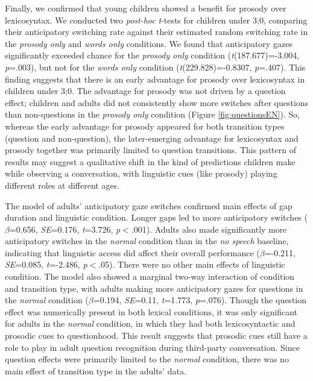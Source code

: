 \documentclass[authoryear, 12pt]{elsarticle}
\begin{document}
Finally, we confirmed that young children showed a benefit for prosody over lexicosyntax. We conducted two \textit{post-hoc} \textit{t}-tests for children under 3;0, comparing their anticipatory switching rate against their estimated random switching rate in the \textit{prosody only} and \textit{words only} conditions. We found that anticipatory gazes significantly exceeded chance for the \textit{prosody only} condition (\textit{t}(187.677)=-3.004, \textit{p}=.003), but not for the \textit{words only} condition (\textit{t}(229.828)=-0.8307, \textit{p}=.407). This finding suggests that there is an early advantage for prosody over lexicosyntax in children under 3;0. The advantage for prosody was not driven by a question effect; children and adults did not consistently show more switches after questions than non-questions in the \textit{prosody only} condition (Figure \ref{fig:questionsEN}). So, whereas the early advantage for prosody appeared for both transition types (question and non-question), the later-emerging advantage for lexicosyntax and prosody together was primarily limited to question transitions. This pattern of results may suggest a qualitative shift in the kind of predictions children make while observing a conversation, with linguistic cues (like prosody) playing different roles at different ages.

The model of adults' anticipatory gaze switches confirmed main effects of gap duration and linguistic condition. Longer gaps led to more anticipatory switches (\textit{$\beta$}=0.656, \textit{SE}=0.176, \textit{t}=3.726, \textit{p}$<$.001). Adults also made significantly more anticipatory switches in the \textit{normal} condition than in the \textit{no speech} baseline, indicating that linguistic access did affect their overall performance (\textit{$\beta$}=-0.211, \textit{SE}=0.085, \textit{t}=-2.486, \textit{p}$<$.05). There were no other main effects of linguistic condition. The model also showed a marginal two-way interaction of condition and transition type, with adults making more anticipatory gazes for questions in the \textit{normal} condition (\textit{$\beta$}=0.194, \textit{SE}=0.11, \textit{t}=1.773, \textit{p}=.076). Though the question effect was numerically present in both lexical conditions, it was only significant for adults in the \textit{normal} condition, in which they had both lexicosyntactic and prosodic cues to questionhood. This result suggests that prosodic cues still have a role to play in adult question recognition during third-party conversation. Since question effects were primarily limited to the \textit{normal} condition, there was no main effect of transition type in the adults' data.
\end{document}
